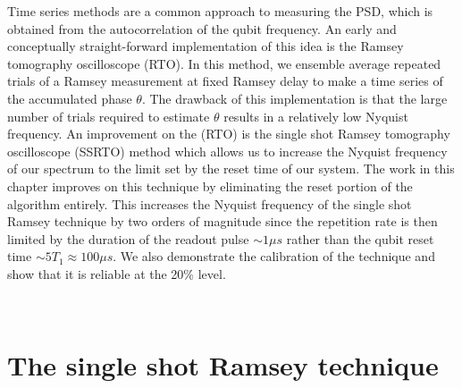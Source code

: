 Time series methods are a common approach to measuring the PSD, which is obtained from the autocorrelation of the qubit frequency.
An early and conceptually straight-forward implementation of this idea is the Ramsey tomography oscilloscope (RTO).\cite{Sank2012}
In this method, we ensemble average repeated trials of a Ramsey measurement at fixed Ramsey delay to make a time series of the accumulated phase $\theta$.
The drawback of this implementation is that the large number of trials required to estimate $\theta$ results in a relatively low Nyquist frequency.
An improvement on the (RTO) is the single shot Ramsey tomography oscilloscope (SSRTO) method\cite{Yan2012}
which allows us to increase the Nyquist frequency of our spectrum to the limit set by the reset time of our system.
The work in this chapter improves on this technique by eliminating the reset portion of the algorithm entirely.
This increases the Nyquist frequency of the single shot Ramsey technique by two orders of magnitude since the repetition rate is then limited by the duration of the readout pulse $\sim 1 \mu s$ rather than the qubit reset time $\sim 5 T_1 \approx 100 \mu s$.
We also demonstrate the calibration of the technique and show that it is reliable at the 20\% level.

\\

\section{The single shot Ramsey technique}


